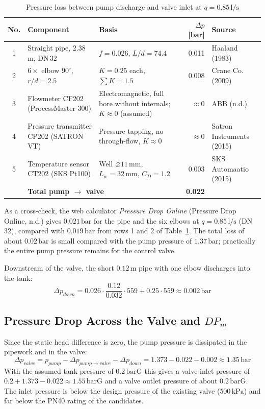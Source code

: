 \documentclass[12pt,a4paper]{article}
\begin{document}
\begin{table}[H]
\centering
\caption{Pressure loss between pump discharge and valve inlet at $q = 0.85\,\text{l/s}$}
\label{tab:loss}
\small
\begin{tabularx}{\textwidth}{@{}cp{3.6cm}Xrp{2.6cm}@{}}
\toprule
No. & Component & Basis & $\Delta p$ [bar] & Source \\
\midrule
1 & Straight pipe, 2.38\,m, DN\,32 & $f = 0.026$, $L/d = 74.4$ & 0.011 & Haaland (1983) \\
2 & $6\times$ elbow $90^\circ$, $r/d = 2.5$ & $K = 0.25$ each, $\sum K = 1.5$ & 0.008 & Crane Co. (2009) \\
3 & Flowmeter CF202 (ProcessMaster 300) & Electromagnetic, full bore without internals; $K \approx 0$ (assumed) & $\approx 0$ & ABB (n.d.) \\
4 & Pressure transmitter CP202 (SATRON VT) & Pressure tapping, no through-flow, $K \approx 0$ & $\approx 0$ & Satron Instruments (2015) \\
5 & Temperature sensor CT202 (SKS Pt100) & Well $\varnothing 11\,\text{mm}$, $L_w = 32\,\text{mm}$, $C_D = 1.2$ & 0.003 & SKS Automaatio (2015) \\
\midrule
 & \multicolumn{2}{l}{\textbf{Total pump $\rightarrow$ valve}} & \textbf{0.022} & \\
\bottomrule
\end{tabularx}
\end{table}

As a cross-check, the web calculator \textit{Pressure Drop Online} (Pressure Drop Online, n.d.) gives $0.021\,\text{bar}$ for the pipe and the six elbows at $q = 0.85\,\text{l/s}$ (DN\,32), compared with $0.019\,\text{bar}$ from rows 1 and 2 of Table~\ref{tab:loss}. The total loss of about $0.02\,\text{bar}$ is small compared with the pump pressure of $1.37\,\text{bar}$; practically the entire pump pressure remains for the control valve.

Downstream of the valve, the short $0.12\,\text{m}$ pipe with one elbow discharges into the tank:
\begin{equation}
    \Delta p_{down} = 0.026\cdot\frac{0.12}{0.032}\cdot 559 + 0.25\cdot 559 \approx 0.002\,\text{bar}
\end{equation}

\subsection{Pressure Drop Across the Valve and \texorpdfstring{$DP_m$}{DPm}}
Since the static head difference is zero, the pump pressure is dissipated in the pipework and in the valve:
\begin{equation}
    \Delta p_{valve} = p_{pump} - \Delta p_{pump\rightarrow valve} - \Delta p_{down} = 1.373 - 0.022 - 0.002 \approx 1.35\,\text{bar}
\end{equation}
With the assumed tank pressure of $0.2\,\text{barG}$ this gives a valve inlet pressure of $0.2 + 1.373 - 0.022 \approx 1.55\,\text{barG}$ and a valve outlet pressure of about $0.2\,\text{barG}$. The inlet pressure is below the design pressure of the existing valve ($500\,\text{kPa}$) and far below the PN40 rating of the candidates.
\end{document}
